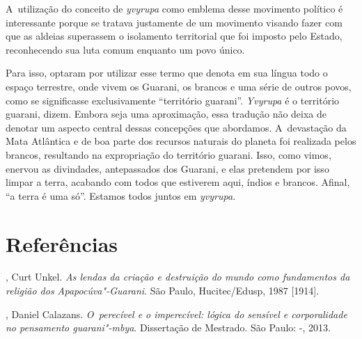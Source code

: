 A~utilização do conceito de \emph{yvyrupa} como emblema desse movimento
político é interessante porque se tratava justamente de um movimento
visando fazer com que as aldeias superassem o isolamento territorial
que foi imposto pelo Estado, reconhecendo sua luta comum enquanto um
povo único.

Para isso, optaram por utilizar esse termo que denota em sua língua todo
o espaço terrestre, onde vivem os Guarani, os brancos e uma série de
outros povos, como se significasse exclusivamente ``território guarani''.
\emph{Yvyrupa} é o território guarani, dizem. Embora seja uma aproximação,
essa tradução não deixa de denotar um aspecto central dessas concepções
que abordamos. A~devastação da Mata Atlântica e de boa parte dos
recursos naturais do planeta foi realizada pelos brancos, resultando na
expropriação do território guarani. Isso, como vimos, enervou as
divindades, antepassados dos Guarani, e elas pretendem por isso limpar
a terra, acabando com todos que estiverem aqui, índios e brancos.
Afinal, ``a terra é uma só''. Estamos todos juntos em \emph{yvyrupa}.

\section{Referências}

\begin{Parskip}
, Curt Unkel. \emph{As lendas da criação e destruição do mundo
como fundamentos da religião dos Apapocúva"-Guarani}. São Paulo,
Hucitec/Edusp, 1987 [1914].

, Daniel Calazans. \emph{O~perecível e o imperecível: lógica do
sensível e corporalidade no pensamento guarani"-mbya}. Dissertação de
Mestrado. São Paulo: -, 2013.
\end{Parskip}

\clearpage

\vspace*{\fill}

